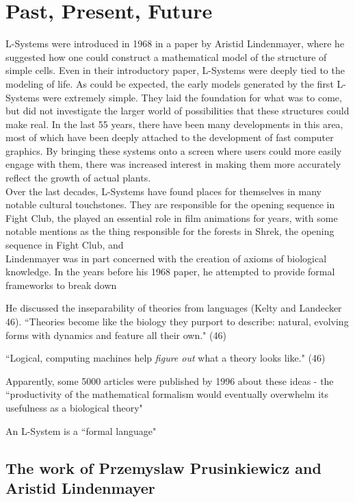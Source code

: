 \documentclass[12pt,twoside]{reedthesis}
\begin{document}
\chapter{Past, Present, Future}

	L-Systems were introduced in 1968 in a paper by Aristid Lindenmayer, where he suggested how one could construct a mathematical model of the structure of simple cells. Even in their introductory paper, L-Systems were deeply tied to the modeling of life. As could be expected, the early models generated by the first L-Systems were extremely simple. They laid the foundation for what was to come, but did not investigate the larger world of possibilities that these structures could make real. In the last 55 years, there have been many developments in this area, most of which have been deeply attached to the development of fast computer graphics. By bringing these systems onto a screen where users could more easily engage with them, there was increased interest in making them more accurately reflect the growth of actual plants.\\
	
	Over the last decades, L-Systems have found places for themselves in many notable cultural touchstones. They are responsible for the opening sequence in Fight Club, the
	played an essential role in film animations for years, with some notable mentions as the thing responsible for the forests in Shrek, the opening sequence in Fight Club, and  \\
	
	Lindenmayer was in part concerned with the creation of axioms of biological knowledge. In the years before his 1968 paper, he attempted to provide formal frameworks to break down 
	
	He discussed the inseparability of theories from languages (Kelty and Landecker 46). ``Theories become like the biology they purport to describe: natural, evolving forms with dynamics and feature all their own." (46)
	
	``Logical, computing machines help \textit{figure out} what a theory looks like." (46)
	
	
	Apparently, some 5000 articles were published by 1996 about these ideas - the ``productivity of the mathematical formalism would eventually overwhelm its usefulness as a biological theory"
	
	An L-System is a ``formal language"
	


\section{The work of Przemyslaw Prusinkiewicz and Aristid Lindenmayer}
\end{document}
